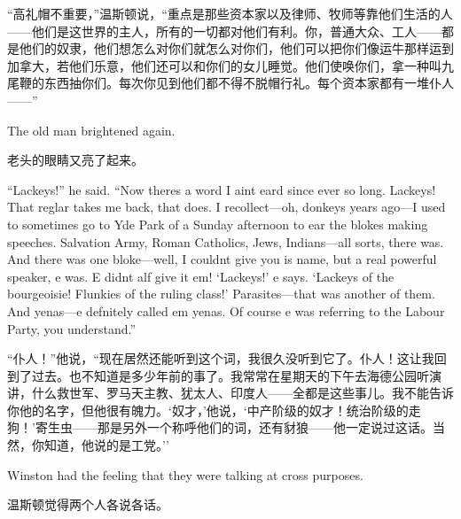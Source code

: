 \begin{paracol}{2}
\switchcolumn

``高礼帽不重要，''温斯顿说，``重点是那些资本家以及律师、牧师等靠他们生活的人——他们是这世界的主人，所有的一切都对他们有利。你，普通大众、工人——都是他们的奴隶，他们想怎么对你们就怎么对你们，他们可以把你们像运牛那样运到加拿大，若他们乐意，他们还可以和你们的女儿睡觉。他们使唤你们，拿一种叫九尾鞭的东西抽你们。每次你见到他们都不得不脱帽行礼。每个资本家都有一堆仆人——''

\switchcolumn*

The old man brightened again.

\switchcolumn

老头的眼睛又亮了起来。

\switchcolumn*

``Lackeys!'' he said. ``Now there\textquotesingle s a word I
ain\textquotesingle t \textquotesingle eard since ever so long. Lackeys!
That reg\textquotesingle lar takes me back, that does. I recollect---oh,
donkey\textquotesingle s years ago---I used to sometimes go to
\textquotesingle Yde Park of a Sunday afternoon to \textquotesingle ear
the blokes making speeches. Salvation Army, Roman Catholics, Jews,
Indians---all sorts, there was. And there was one bloke---well, I
couldn\textquotesingle t give you \textquotesingle is name, but a real
powerful speaker, \textquotesingle e was. \textquotesingle E
didn\textquotesingle t \textquotesingle alf give it \textquotesingle em!
`Lackeys!' \textquotesingle e says.
`Lackeys of the bourgeoisie! Flunkies of the ruling
class!' Parasites---that was another of them. And
\textquotesingle yenas---\textquotesingle e def\textquotesingle nitely
called \textquotesingle em \textquotesingle yenas. Of course
\textquotesingle e was referring to the Labour Party, you understand.''

\switchcolumn

``仆人！''他说，``现在居然还能听到这个词，我很久没听到它了。仆人！这让我回到了过去。也不知道是多少年前的事了。我常常在星期天的下午去海德公园听演讲，什么救世军、罗马天主教、犹太人、印度人——全都是这些事儿。我不能告诉你他的名字，但他很有魄力。`奴才，'他说，`中产阶级的奴才！统治阶级的走狗！'寄生虫——那是另外一个称呼他们的词，还有豺狼——他一定说过这话。当然，你知道，他说的是工党。''

\switchcolumn*

Winston had the feeling that they were talking at cross purposes.

\switchcolumn

温斯顿觉得两个人各说各话。

\switchcolumn*


\end{paracol}
